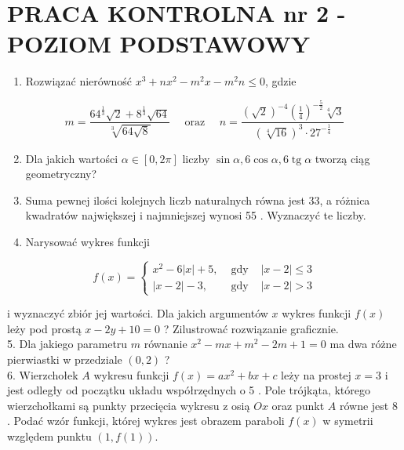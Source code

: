 \documentclass[10pt]{article}
\begin{document}
\section*{PRACA KONTROLNA nr 2 - POZIOM PODSTAWOWY}
\begin{enumerate}
  \item Rozwiązać nierówność $x^{3}+n x^{2}-m^{2} x-m^{2} n \leqslant 0$, gdzie
\end{enumerate}

$$
m=\frac{64^{\frac{1}{3}} \sqrt{2}+8^{\frac{1}{3}} \sqrt{64}}{\sqrt[3]{64 \sqrt{8}}} \quad \text { oraz } \quad n=\frac{(\sqrt{2})^{-4}\left(\frac{1}{4}\right)^{-\frac{5}{2}} \sqrt[4]{3}}{(\sqrt[4]{16})^{3} \cdot 27^{-\frac{1}{4}}}
$$

\begin{enumerate}
  \setcounter{enumi}{1}
  \item Dla jakich wartości $\alpha \in[0,2 \pi]$ liczby $\sin \alpha, 6 \cos \alpha, 6 \operatorname{tg} \alpha$ tworzą ciąg geometryczny?
  \item Suma pewnej ilości kolejnych liczb naturalnych równa jest 33, a różnica kwadratów największej i najmniejszej wynosi 55 . Wyznaczyć te liczby.
  \item Narysować wykres funkcji
\end{enumerate}

$$
f(x)=\left\{\begin{array}{lll}
x^{2}-6|x|+5, & \text { gdy } & |x-2| \leqslant 3 \\
|x-2|-3, & \text { gdy } & |x-2|>3
\end{array}\right.
$$

i wyznaczyć zbiór jej wartości. Dla jakich argumentów $x$ wykres funkcji $f(x)$ leży pod prostą $x-2 y+10=0$ ? Zilustrować rozwiązanie graficznie.\\
5. Dla jakiego parametru $m$ równanie $x^{2}-m x+m^{2}-2 m+1=0$ ma dwa różne pierwiastki w przedziale $(0,2)$ ?\\
6. Wierzchołek $A$ wykresu funkcji $f(x)=a x^{2}+b x+c$ leży na prostej $x=3$ i jest odległy od początku układu współrzędnych o 5 . Pole trójkąta, którego wierzchołkami są punkty przecięcia wykresu z osią $O x$ oraz punkt $A$ równe jest 8 . Podać wzór funkcji, której wykres jest obrazem paraboli $f(x)$ w symetrii względem punktu $(1, f(1))$.
\end{document}
